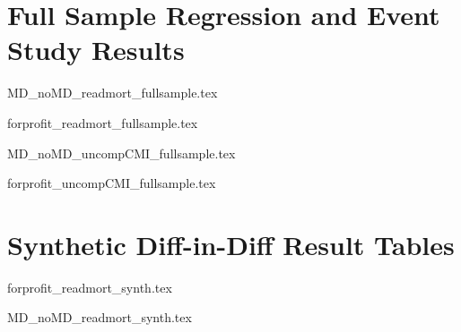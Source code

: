 \documentclass[12pt]{article}
\begin{document}
\section{Full Sample Regression and Event Study Results}\label{app:fullsample}

{MD_noMD_readmort_fullsample.tex}

{forprofit_readmort_fullsample.tex}

{MD_noMD_uncompCMI_fullsample.tex}

{forprofit_uncompCMI_fullsample.tex}

\section{Synthetic Diff-in-Diff Result Tables}

{forprofit_readmort_synth.tex}

{MD_noMD_readmort_synth.tex}


    

    

    

    

    

    

	
	
	
\end{document}
